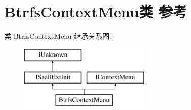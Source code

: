 \hypertarget{class_btrfs_context_menu}{}\section{Btrfs\+Context\+Menu类 参考}
\label{class_btrfs_context_menu}
类 Btrfs\+Context\+Menu 继承关系图\+:\begin{figure}[H]
\begin{center}
\leavevmode
\includegraphics[height=3.000000cm]{class_btrfs_context_menu}
\end{center}
\end{figure}
